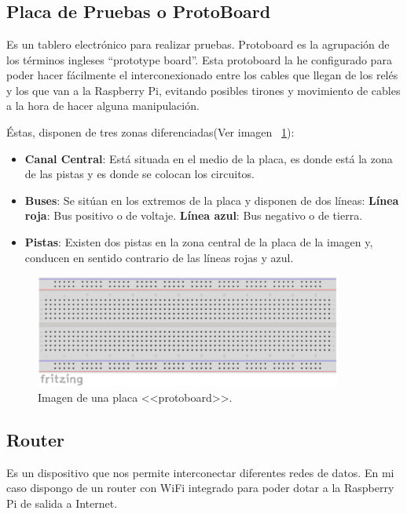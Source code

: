 ~\\~\\~\\

\subsection{Placa de Pruebas o ProtoBoard}\label{4:protoboard}
Es un tablero electrónico para realizar pruebas. Protoboard es la agrupación de los términos ingleses “prototype board”.
Esta protoboard la he configurado para poder hacer fácilmente el interconexionado entre los cables que llegan de los relés y los que van a la Raspberry Pi, evitando posibles tirones y movimiento de cables a la hora de hacer alguna manipulación.

Éstas, disponen de tres zonas diferenciadas(Ver imagen ~\ref{Img:Protoboard}):

\begin{itemize}
    \item \textbf{Canal Central}: Está situada en el medio de la placa, es donde está la zona de las pistas y es donde se colocan los circuitos.
    \item \textbf{Buses}: Se sitúan en los extremos de la placa y disponen de dos líneas:
        \subitem \textbf{Línea roja}: Bus positivo o de voltaje.
        \subitem \textbf{Línea azul}: Bus negativo o de tierra.
    \item \textbf{Pistas}: Existen dos pistas en la zona central de la placa de la imagen y, conducen en sentido contrario de las líneas rojas y azul.
\end{itemize}

\begin{figure}
    \centering
    \includegraphics[width=0.9\textwidth]{img/protoboard.pdf}
    \caption{Imagen de una placa <<protoboard>>. } \label{Img:Protoboard}
\end{figure}

\subsection{Router}\label{4:Router}
Es un dispositivo que nos permite interconectar diferentes redes de datos. En mi caso dispongo de un router con WiFi integrado para poder dotar a la Raspberry Pi de salida a Internet.

